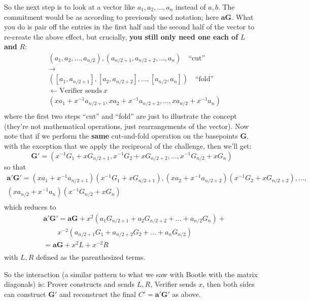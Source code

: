 \documentclass[10pt,a4paper]{article}
\begin{document}
So the next step is to look at a vector like $a_1, a_2, \ldots , a_n$ instead of $a, b$. The commitment
would be as according to previously used notation; here $\mathbf{aG}$. What you do is pair
off the entries in the first half and the second half of the vector to
re-create the above effect, but crucially, \textbf{you still only need
one each of }$L$ \textbf{and} $R$:
\begin{align*}
& (a_1, a_2, \ldots, a_{n/2}), (a_{n/2 + 1}, a_{n/2 +2}, \ldots, a_n) \quad \textrm{``cut''}\\
& \rightarrow \\
& ([a_1, a_{n/2+1}], [a_2, a_{n/2+2}], \ldots, [a_{n/2}, a_{n}]) \quad \textrm{``fold''}\\
& \leftarrow \textrm{Verifier sends} \ x \\
& (xa_1 + x^{-1}a_{n/2+1}, xa_2 + x^{-1}a_{n/2+2}, \ldots, xa_{n/2} + x^{-1}a_{n}) \\
\end{align*}
where the first two steps ``cut'' and ``fold'' are just to illustrate
the concept (they're not mathematical operations, just rearrangements of
the vector). Now note that if we perform the \textbf{same} cut-and-fold
operation on the basepoints $\mathbf{G}$, with the exception that we apply the
reciprocal of the challenge, then we'll get:
\[\textbf{G}' = (x^{-1}G_1 + x G_{n/2+1}, x^{-1}G_2+xG_{n/2+2}, \ldots, x^{-1}G_{n/2} + xG_n)\]
so that
\begin{align*}
\textbf{a}'\textbf{G}' = (xa_1 + x^{-1}a_{n/2+1})(x^{-1}G_1 + x G_{n/2+1}),
(xa_2 + x^{-1}a_{n/2+2})(x^{-1}G_2+xG_{n/2+2}), \ldots, \\
(xa_{n/2} + x^{-1}a_{n})(x^{-1}G_{n/2} + xG_n) \\
\end{align*}
which reduces to
\begin{align*}
& \textbf{a}'\textbf{G}' = \textbf{aG} + x^2\left(a_1G_{n/2+1} + a_2G_{n/2+2}+\ldots+a_{n/2}G_{n}\right) + \\
& \quad \quad x^{-2}\left(a_{n/2+1}G_1 + a_{n/2+2}G_2+\ldots + a_nG_{n/2}\right) \\
& = \textbf{aG} + x^2L + x^{-2}R \\
\end{align*}
with $L, R$ defined as the parenthesized terms.

So the interaction (a similar pattern to what we saw with Bootle with
the matrix diagonals) is: Prover constructs and sends $L, R$, Verifier sends $x$,
then both sides can construct $\mathbf{G}'$ and reconstruct the final $C' = \textbf{a}'\textbf{G}'$ as above.
\end{document}
